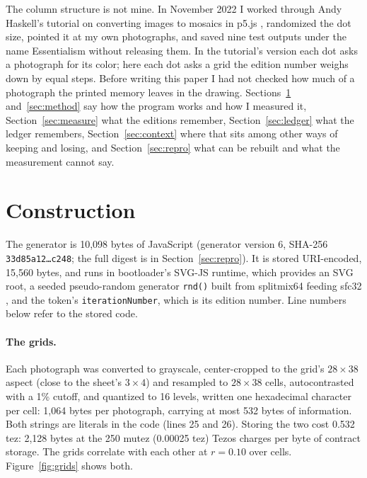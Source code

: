 \documentclass[11pt]{article}
\begin{document}
The column structure is not mine. In November 2022 I worked through Andy Haskell's tutorial on converting images to mosaics in p5.js \citep{haskell2022}, randomized the dot size, pointed it at my own photographs, and saved nine test outputs under the name Essentialism without releasing them. In the tutorial's version each dot asks a photograph for its color; here each dot asks a grid the edition number weighs down by equal steps. Before writing this paper I had not checked how much of a photograph the printed memory leaves in the drawing. Sections~\ref{sec:construction} and~\ref{sec:method} say how the program works and how I measured it, Section~\ref{sec:measure} what the editions remember, Section~\ref{sec:ledger} what the ledger remembers, Section~\ref{sec:context} where that sits among other ways of keeping and losing, and Section~\ref{sec:repro} what can be rebuilt and what the measurement cannot say.

\section{Construction}
\label{sec:construction}

The generator is 10{,}098 bytes of JavaScript (generator version 6, SHA-256 \texttt{33d85a12\ldots c248}; the full digest is in Section~\ref{sec:repro}). It is stored URI-encoded, 15{,}560 bytes, and runs in bootloader's SVG-JS runtime, which provides an SVG root, a seeded pseudo-random generator \texttt{rnd()} built from splitmix64 \citep{steele2014} feeding sfc32 \citep{practrand}, and the token's \texttt{iterationNumber}, which is its edition number. Line numbers below refer to the stored code.

\paragraph{The grids.} Each photograph was converted to grayscale, center-cropped to the grid's $28\times38$ aspect (close to the sheet's $3\times4$) and resampled to $28\times38$ cells, autocontrasted with a 1\% cutoff, and quantized to 16 levels, written one hexadecimal character per cell: 1{,}064 bytes per photograph, carrying at most 532 bytes of information. Both strings are literals in the code (lines 25 and 26). Storing the two cost 0.532 tez: 2{,}128 bytes at the 250 mutez (0.00025 tez) Tezos charges per byte of contract storage. The grids correlate with each other at $r = 0.10$ over cells. Figure~\ref{fig:grids} shows both.
\end{document}
